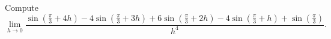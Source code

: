 Compute \[\lim_{h\to 0}\dfrac{\sin(\frac{\pi}{3}+4h)-4\sin(\frac{\pi}{3}+3h)+6\sin(\frac{\pi}{3}+2h)-4\sin(\frac{\pi}{3}+h)+\sin(\frac{\pi}{3})}{h^4}.\]